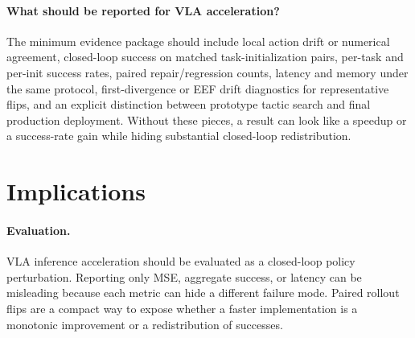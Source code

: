 \documentclass[10pt]{article}
\begin{document}
\paragraph{What should be reported for VLA acceleration?}
The minimum evidence package should include local action drift or numerical agreement, closed-loop success on matched task-initialization pairs, per-task and per-init success rates, paired repair/regression counts, latency and memory under the same protocol, first-divergence or EEF drift diagnostics for representative flips, and an explicit distinction between prototype tactic search and final production deployment. Without these pieces, a result can look like a speedup or a success-rate gain while hiding substantial closed-loop redistribution.

\section{Implications}

\paragraph{Evaluation.}
VLA inference acceleration should be evaluated as a closed-loop policy perturbation. Reporting only MSE, aggregate success, or latency can be misleading because each metric can hide a different failure mode. Paired rollout flips are a compact way to expose whether a faster implementation is a monotonic improvement or a redistribution of successes.
\end{document}
